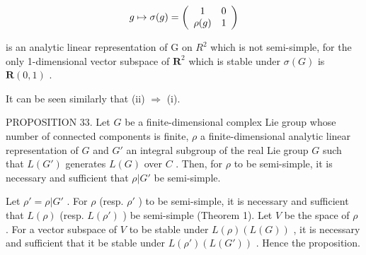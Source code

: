 \[
g \mapsto \sigma (g) = \left( \begin{array}{c c} 1 & 0 \\ \rho (g) & 1 \end{array} \right)
\]

is an analytic linear representation of G on \(R^{2}\) which is not semi-simple, for the only 1-dimensional vector subspace of \(\mathbf{R}^2\) which is stable under \(\sigma(G)\) is \(\mathbf{R}(0,1)\) .

It can be seen similarly that (ii) \(\Rightarrow\) (i).

PROPOSITION 33. Let \(G\) be a finite-dimensional complex Lie group whose number of connected components is finite, \(\rho\) a finite-dimensional analytic linear representation of \(G\) and \(G'\) an integral subgroup of the real Lie group \(G\) such that \(L(G')\) generates \(L(G)\) over \(C\) . Then, for \(\rho\) to be semi-simple, it is necessary and sufficient that \(\rho |G'\) be semi-simple.

Let \(\rho' = \rho|G'\) . For \(\rho\) (resp. \(\rho'\) ) to be semi-simple, it is necessary and sufficient that \(L(\rho)\) (resp. \(L(\rho')\) ) be semi-simple (Theorem 1). Let \(V\) be the space of \(\rho\) . For a vector subspace of \(V\) to be stable under \(L(\rho)(L(G))\) , it is necessary and sufficient that it be stable under \(L(\rho')(L(G'))\) . Hence the proposition.

